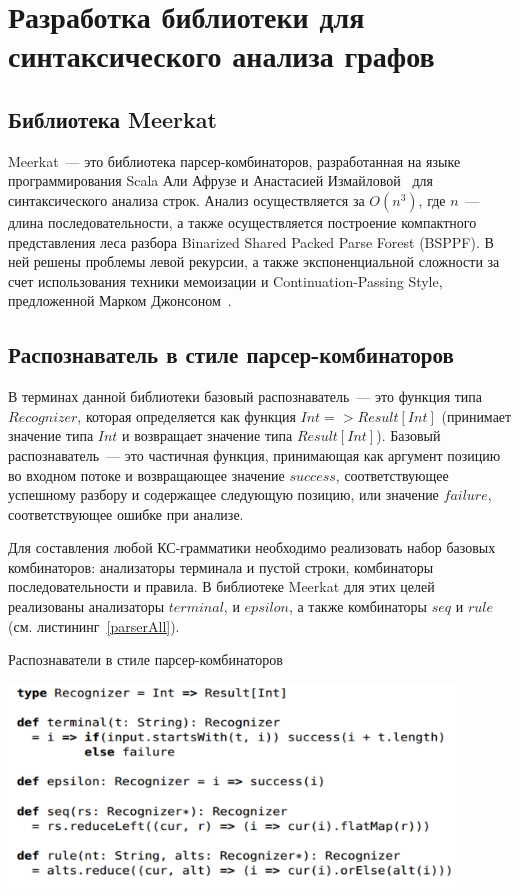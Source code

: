 \section{Разработка библиотеки для синтаксического анализа графов}
\subsection{Библиотека Meerkat}
Meerkat~--- это библиотека парсер-комбинаторов, разработанная на языке программирования Scala Али Афрузе и Анастасией Измайловой~\cite{IzmCombinator} для синтаксического анализа строк. Анализ осуществляется за $O(n^3)$, где $n$~--- длина последовательности, а также осуществляется построение компактного представления леса разбора Binarized Shared Packed Parse Forest (BSPPF). В ней решены проблемы левой рекурсии, а также экспоненциальной сложности за счет использования техники мемоизации и Continuation-Passing Style, предложенной Марком Джонсоном~\cite{MemoizationInTopDown}.

\subsection{Распознаватель в стиле парсер-комбинаторов}
В терминах данной библиотеки базовый распознаватель~--- это функция типа $Recognizer$, которая определяется как функция $Int => Result[Int]$ (принимает значение типа $Int$ и возвращает значение типа $Result[Int]$). Базовый распознаватель~--- это частичная функция, принимающая как аргумент позицию во входном потоке и возвращающее значение $success$, соответствующее успешному разбору и содержащее следующую позицию, или значение $failure$, соответствующее ошибке при анализе.

Для составления любой КС-грамматики необходимо реализовать набор базовых комбинаторов: анализаторы терминала и пустой строки, комбинаторы последовательности и правила. В библиотеке Meerkat для этих целей реализованы анализаторы $terminal$, и $epsilon$, а также комбинаторы $seq$ и $rule$ (см. листининг~\ref{parserAll}).

\begin{listing}
\caption{Распознаватели в стиле парсер-комбинаторов}
\label{parserAll}
\centering
\includegraphics[width=0.9\textwidth]{Smolina/pics/combinators.png}
\end{listing}

